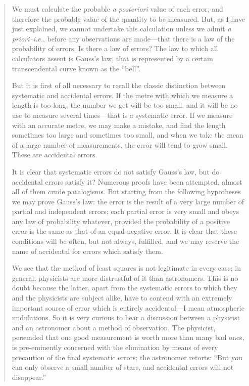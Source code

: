  \begin{quote}
     We must calculate the probable \emph{a posteriori} value of each error, and therefore the probable value of the quantity to be measured.  But, as I have just explained, we cannot undertake this calculation unless we admit \emph{a priori--i.e.}, before any observations are made---that there is a law of the probability of errors.  Is there a law of errors?  The law to which all calculators assent is Gauss's law, that is represented by a certain transcendental curve known as the ``bell''.
     
     But it is first of all necessary to recall the classic distinction between systematic and accidental errors.  If the metre with which we measure a length is too long, the number we get will be too small, and it will be no use to measure several times---that is a systematic error.  If we measure with an accurate metre, we may make a mistake, and find the length sometimes too large and sometimes too small, and when we take the mean of a large number of measurements, the error will tend to grow small.  These are accidental errors.  
     
     It is clear that systematic errors do not satisfy Gauss's law, but do accidental errors satisfy it?  Numerous proofs have been attempted, almost all of them crude paralogisms.  But starting from the following hypotheses we may prove Gauss's law: the error is the result of a very large number of partial and independent errors; each partial error is very small and obeys any law of probability whatever, provided the probability of a positive error is the same as that of an equal negative error.  It is clear that these conditions will be often, but not always, fulfilled, and we may reserve the name of accidental for errors which satisfy them.
     
     We see that the method of least squares is not legitimate in every case; in general, physicists are more distrustful of it than astronomers.  This is no doubt because the latter, apart from the systematic errors to which they and the physicists are subject alike, have to contend with an extremely important source of error which is entirely accidental---I mean atmospheric undulations.  So it is very curious to hear a discussion between a physicist and an astronomer about a method of observation.  The physicist, persuaded that one good measurement is worth more than many bad ones, is pre-eminently concerned with the elimination by means of every precaution of the final systematic errors; the astronomer retorts: ``But you can only observe a small number of stars, and accidental errors will not disappear.''
     

\end{quote}
